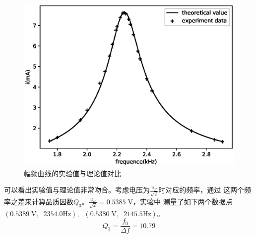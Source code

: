 \documentclass[a4paper]{ctexart}
\def\V{\mathrm{V}}
\begin{document}
    \begin{figure}[htbp]
        \centering
        \includegraphics[scale=0.75]{amplitude.eps}
        \caption{幅频曲线的实验值与理论值对比}
    \end{figure}
    \par 
    可以看出实验值与理论值非常吻合。考虑电压为$\frac{u_{R}}{\sqrt{2}}$时对应的频率，通过
    这两个频率之差来计算品质因数$Q_{3}$。$\frac{u_{R}}{\sqrt{2}} = 0.5385 \;\V$，实验中
    测量了如下两个数据点$(0.5389\;\V,\;\;2354.0\mathrm{Hz}),\;\;(0.5380\;\V,\;\;2145.5\mathrm{Hz})$。
    $$
    Q_{3} = \frac{f_{0}}{\Delta f} = 10.79
    $$\\
\end{document}
